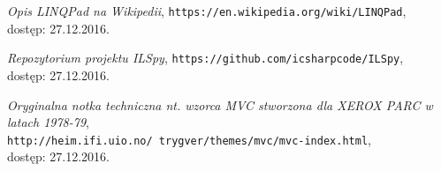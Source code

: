 \documentclass[a4paper,twoside,titlepage,openright]{book}
\begin{document}
\begin{thebibliography}{99}
 \textit{Opis LINQPad na Wikipedii}, 
\texttt{https://en.wikipedia.org/wiki/LINQPad}, \\dostęp: 27.12.2016.

 \textit{Repozytorium projektu ILSpy}, 
\texttt{https://github.com/icsharpcode/ILSpy}, \\dostęp: 27.12.2016.

 \textit{Oryginalna notka techniczna nt. wzorca MVC stworzona dla XEROX PARC w latach 1978-79}, \\
\texttt{http://heim.ifi.uio.no/~trygver/themes/mvc/mvc-index.html}, \\dostęp: 27.12.2016.




\end{thebibliography}
\end{document}
